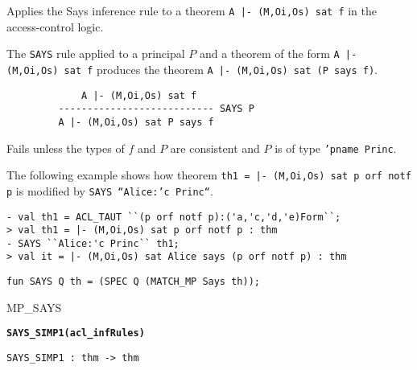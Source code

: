 \SYNOPSIS
Applies the Says inference rule to a theorem \texttt{A |- (M,Oi,Os) sat f}
in the access-control logic.

\DESCRIBE The \texttt{SAYS} rule applied to a principal $P$ and a
theorem of the form \texttt{A |- (M,Oi,Os) sat f} produces the theorem
\texttt{A |- (M,Oi,Os) sat (P says f)}.
\begin{verbatim}
             A |- (M,Oi,Os) sat f
         --------------------------- SAYS P
         A |- (M,Oi,Os) sat P says f
\end{verbatim}

\FAILURE
Fails unless the types of $f$ and $P$ are consistent and $P$ is of type
\texttt{'pname Princ}.

\EXAMPLE
The following example shows how theorem \texttt{th1 = |- (M,Oi,Os) sat
  p orf notf p} is modified by \texttt{SAYS ``Alice:'c Princ``}.
\begin{holboxed}
\begin{verbatim}
- val th1 = ACL_TAUT ``(p orf notf p):('a,'c,'d,'e)Form``;
> val th1 = |- (M,Oi,Os) sat p orf notf p : thm
- SAYS ``Alice:'c Princ`` th1;
> val it = |- (M,Oi,Os) sat Alice says (p orf notf p) : thm
\end{verbatim}
\end{holboxed}
\IMPLEMENTATION
\begin{holboxed}
\begin{verbatim}
fun SAYS Q th = (SPEC Q (MATCH_MP Says th));
\end{verbatim}
\end{holboxed}
\SEEALSO
MP\_SAYS
\ENDDOC

\begin{holboxed}
  \begin{Large}
    \textbf{\texttt{SAYS_SIMP1}}\hfill{}\textbf{\texttt{(acl\_infRules)}}
  \end{Large}
\end{holboxed}

\begin{verbatim}
SAYS_SIMP1 : thm -> thm
\end{verbatim}

